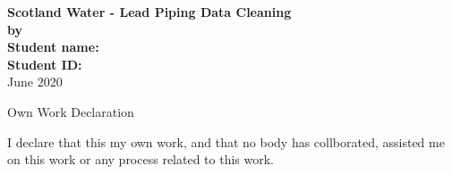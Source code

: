 \documentclass[11pt,twoside]{article}
\numberwithin{Theorem}{section}
\numberwithin{Definition}{section}
\numberwithin{Lemma}{section}
\numberwithin{Algorithm}{section}
\numberwithin{equation}{section}
\begin{document}
\pagestyle{empty}

\begin{titlepage}
\vspace*{.5em}
\center
\vspace*{1em}
\vspace{2em}
\textbf{\Huge{Scotland Water - Lead Piping Data Cleaning}}\\[2em]
\textbf{\LARGE{by}}\\
\vspace{2em}
\textbf{\LARGE{Student name:}}\\
\vspace{1em}
\textbf{\LARGE{Student ID:}}\\
\vspace{6.5em}
\vspace{6.5em}
\Large{June 2020}\\
\vspace{3em}
\vfill
\end{titlepage}

\clearpage





\begin{center}
\Large{Own Work Declaration}
\end{center}
I declare that this my own work, and that no body has collborated, assisted
me on this work or any process related to this work.

\cleardoublepage




\tableofcontents
\clearpage

\pagestyle{plain}
\setcounter{page}{1}
\end{document}
